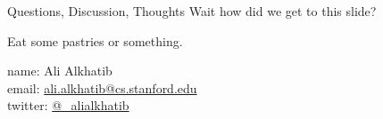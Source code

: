 \documentclass[presentation]{subfiles}
\begin{document}
  \begin{frame}{Questions, Discussion, Thoughts}
     Wait how did we get to this slide?

     Eat some pastries or something.
    

      name: {Ali Alkhatib} \\
      email: \href{mailto:ali.alkhatib@cs.stanford.edu}{ali.alkhatib@cs.stanford.edu} \\
      twitter: \href{https://twitter.com/_alialkhatib}{@\_alialkhatib} \\
  \end{frame}
\end{document}
